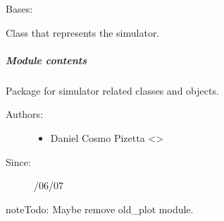 \documentclass[a4paper,10pt,english]{sphinxmanual}
\begin{document}
\begin{fulllineitems}
\label{\detokenize{autodoc/mrsprint/mrsprint.simulator:mrsprint.simulator.simulator.Simulator}}
Bases: 

Class that represents the simulator.

\end{fulllineitems}



\subparagraph{Module contents}
\label{\detokenize{autodoc/mrsprint/mrsprint.simulator:module-mrsprint.simulator}}\label{\detokenize{autodoc/mrsprint/mrsprint.simulator:module-contents}}
Package for simulator related classes and objects.
\begin{description}
\item[{Authors:}] \leavevmode\begin{itemize}
\item {} 
Daniel Cosmo Pizetta \textless{}\textgreater{}

\end{itemize}

\item[{Since:}] /06/07

\end{description}

\begin{sphinxadmonition}{note}{\label{autodoc/mrsprint/mrsprint.simulator:index-0}Todo:}
Maybe remove old\_plot module.
\end{sphinxadmonition}
\end{document}
